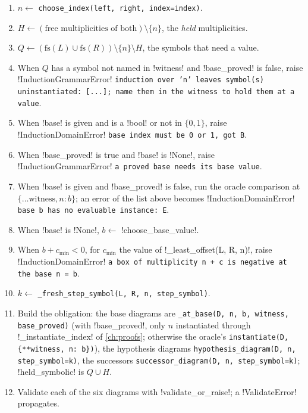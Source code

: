 \begin{algorithm}\label{alg:kernel-obligation}
\begin{enumerate}
\item $n \gets$ \texttt{choose\_\allowbreak{}index(\allowbreak{}left,\allowbreak{} right,\allowbreak{} index=index)}.
\item $H \gets (\text{free multiplicities of both})\setminus\{n\}$, the \emph{held} multiplicities.
\item $Q \gets (\mathrm{fs}(L)\cup\mathrm{fs}(R))\setminus\{n\}\setminus H$, the symbols that need a value.
\item When $Q$ has a symbol not named in \code!witness! and \code!base_proved! is false, raise \py!InductionGrammarError! \texttt{induction over 'n' leaves symbol(\allowbreak{}s) uninstantiated: [.\allowbreak{}.\allowbreak{}.\allowbreak{}]; name them in the witness to hold them at a value}.
\item When \code!base! is given and is a \py!bool! or not in $\{0,1\}$, raise \py!InductionDomainError! \texttt{base index must be 0 or 1,\allowbreak{} got B}.
\item When \code!base_proved! is true and \code!base! is \py!None!, raise \py!InductionGrammarError! \texttt{a proved base needs its base value}.
\item When \code!base! is given and \code!base_proved! is false, run the oracle comparison at $\{\ldots\text{witness}, n: b\}$; an error of the list above becomes \py!InductionDomainError! \texttt{base b has no evaluable instance: E}.
\item When \code!base! is \py!None!, $b\gets$ \py!choose_base_value!.
\item When $b+c_{\min}<0$, for $c_{\min}$ the value of \py!_least_offset(L, R, n)!, raise \py!InductionDomainError! \texttt{a box of multiplicity n + c is negative at the base n = b}.
\item $k\gets$ \texttt{\_\allowbreak{}fresh\_\allowbreak{}step\_\allowbreak{}symbol(\allowbreak{}L,\allowbreak{} R,\allowbreak{} n,\allowbreak{} step\_\allowbreak{}symbol)}.
\item Build the obligation: the base diagrams are \texttt{\_\allowbreak{}at\_\allowbreak{}base(\allowbreak{}D,\allowbreak{} n,\allowbreak{} b,\allowbreak{} witness,\allowbreak{} base\_\allowbreak{}proved)} (with \code!base_proved!, only $n$ instantiated through \py!_instantiate_index! of \cref{ch:proofs}; otherwise the oracle's \texttt{instantiate(\allowbreak{}D,\allowbreak{} \{**witness,\allowbreak{} n: b\})}), the hypothesis diagrams \texttt{hypothesis\_\allowbreak{}diagram(\allowbreak{}D,\allowbreak{} n,\allowbreak{} step\_\allowbreak{}symbol=k)}, the successors \texttt{successor\_\allowbreak{}diagram(\allowbreak{}D,\allowbreak{} n,\allowbreak{} step\_\allowbreak{}symbol=k)}; \code!held_symbolic! is $Q\cup H$.
\item Validate each of the six diagrams with \py!validate_or_raise!; a \py!ValidateError! propagates.
\end{enumerate}
\end{algorithm}

